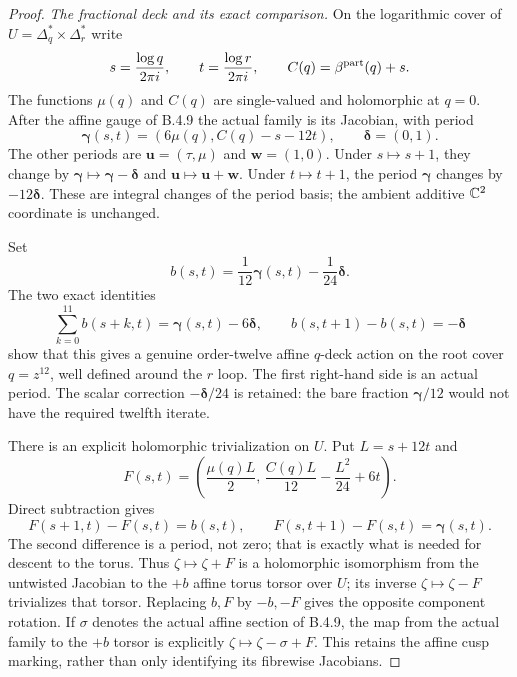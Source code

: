 \begin{proof}
\emph{The fractional deck and its exact comparison.}
On the logarithmic cover of
$U=\Delta_q^*\times\Delta_r^*$ write
\[
 s=\frac{\log q}{2\pi i},\qquad
 t=\frac{\log r}{2\pi i},\qquad
 C(q)=\beta^{\rm part}(q)+s.
\]
The functions $\mu(q)$ and $C(q)$ are single-valued
and holomorphic at $q=0$. After the affine gauge of
B.4.9 the actual family is its Jacobian, with period
\[
 \boldsymbol\gamma(s,t)
       =(6\mu(q),C(q)-s-12t),\qquad
 \boldsymbol\delta=(0,1).
 \tag{B.4.18.1}
\]
The other periods are
$\mathbf u=(\tau,\mu)$ and $\mathbf w=(1,0)$.
Under $s\mapsto s+1$, they change by
$\boldsymbol\gamma\mapsto\boldsymbol\gamma-
\boldsymbol\delta$ and $\mathbf u\mapsto\mathbf u+\mathbf w$.
Under $t\mapsto t+1$, the period $\boldsymbol\gamma$
changes by $-12\boldsymbol\delta$.
These are integral changes of the period basis; the
ambient additive $\mathbb C^2$ coordinate is unchanged.

Set
\[
 b(s,t)=\frac1{12}\boldsymbol\gamma(s,t)
                         -\frac1{24}\boldsymbol\delta.
\]
The two exact identities
\[
 \sum_{k=0}^{11}b(s+k,t)
       =\boldsymbol\gamma(s,t)-6\boldsymbol\delta,
 \qquad
 b(s,t+1)-b(s,t)=-\boldsymbol\delta
 \tag{B.4.18.2}
\]
show that this gives a genuine order-twelve affine
$q$-deck action on the root cover $q=z^{12}$,
well defined around the $r$ loop. The first right-hand
side is an actual period. The scalar correction
$-\boldsymbol\delta/24$ is retained: the bare fraction
$\boldsymbol\gamma/12$ would not have the required
twelfth iterate.

There is an explicit holomorphic trivialization on $U$.
Put $L=s+12t$ and
\[
 F(s,t)=
 \left(\frac{\mu(q)L}{2},\,
       \frac{C(q)L}{12}-\frac{L^2}{24}+6t\right).
 \tag{B.4.18.3}
\]
Direct subtraction gives
\[
 F(s+1,t)-F(s,t)=b(s,t),\qquad
 F(s,t+1)-F(s,t)=\boldsymbol\gamma(s,t).
 \tag{B.4.18.4}
\]
The second difference is a period, not zero; that is
exactly what is needed for descent to the torus.
Thus $\zeta\mapsto\zeta+F$ is a holomorphic
isomorphism from the untwisted Jacobian to the
$+b$ affine torus torsor over $U$; its inverse
$\zeta\mapsto\zeta-F$ trivializes that torsor.
Replacing $b,F$ by $-b,-F$ gives the opposite
component rotation. If $\sigma$ denotes the actual
affine section of B.4.9, the map from the actual
family to the $+b$ torsor is explicitly
$\zeta\mapsto\zeta-\sigma+F$.
This retains the affine cusp marking, rather
than only identifying its fibrewise Jacobians.


\end{proof}
